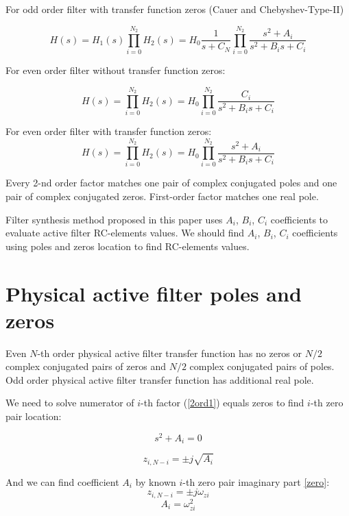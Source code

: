 For odd order filter with transfer function zeros (Cauer and Chebyshev-Type-II)

\begin{equation}
 H(s)=H_1(s)\prod_{i=0}^{N_2}H_2(s) = 
 H_0\frac{1}{s+C_N}\prod_{i=0}^{N_2}\frac{s^2+A_i}{s^2+B_i s+C_i}
\label{trfunc-quad}
\end{equation}

For even order filter without transfer function zeros:

\begin{equation}
 H(s)=\prod_{i=0}^{N_2}H_2(s) = H_0\prod_{i=0}^{N_2}\frac{C_i}{s^2+B_i
s+C_i}
\end{equation}

For even order filter with transfer function zeros:
\begin{equation}
 H(s)=\prod_{i=0}^{N_2}H_2(s) = 
 H_0\prod_{i=0}^{N_2}\frac{s^2+A_i}{s^2+B_i s+C_i}
\end{equation}

Every 2-nd order factor matches one pair of complex conjugated poles and one
pair of complex conjugated zeros. First-order factor matches one real pole.

Filter synthesis method proposed in this paper uses $A_i$, $B_i$, $C_i$
coefficients to evaluate active filter RC-elements values. We should find
$A_i$, $B_i$, $C_i$ coefficients using poles and zeros location to find
RC-elements values.

\section{Physical active filter poles and zeros}

Even $N$-th order physical active filter transfer function has no zeros or $N/2$
complex conjugated pairs of zeros and $N/2$ complex conjugated pairs of poles.
Odd order physical active filter transfer function has additional real pole.

We need to solve numerator of $i$-th factor (\ref{2ord1}) equals zeros to find
$i$-th zero pair location:

\begin{equation}
 s^2+A_i=0
\end{equation}

\begin{equation}
 z_{i,N-i}=\pm j\sqrt{A_i}
\end{equation}

And we can find coefficient $A_i$ by known $i$-th zero pair imaginary part
\ref{zero}:
\begin{equation}
 z_{i,N-i}=\pm j\omega_{zi}
\end{equation}
\begin{equation}
 A_i=\omega_{zi}^2 \label{Ai}
\end{equation}

